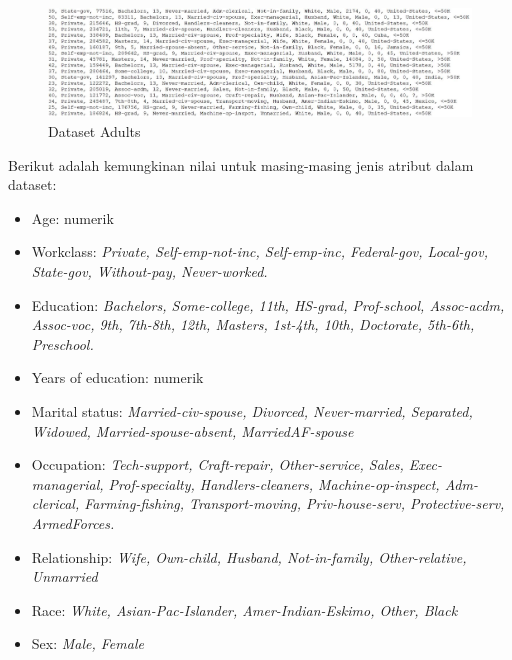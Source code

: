 \documentclass[a4paper,twoside]{article}
\begin{document}
\begin{enumerate}
\begin{adjustwidth}{2.2cm}{0cm}
\begin{figure}[H]
	\centering
	\includegraphics[scale=0.48]{dataset1}
	\caption{Dataset Adults}
	\label{fig:dataset1}
\end{figure}
\end{adjustwidth}

\noindent Berikut adalah kemungkinan nilai untuk masing-masing jenis atribut dalam dataset:

\begin{itemize}
\item Age: numerik

\item Workclass: \textit{Private, Self-emp-not-inc, Self-emp-inc, Federal-gov, Local-gov, State-gov, Without-pay, Never-worked.}

\item Education: \textit{Bachelors, Some-college, 11th, HS-grad, Prof-school, Assoc-acdm, Assoc-voc, 9th, 7th-8th, 12th, Masters, 1st-4th, 10th, Doctorate, 5th-6th, Preschool.}

\item Years of education: numerik

\item Marital status: 
\textit{Married-civ-spouse, Divorced, Never-married, Separated, Widowed, Married-spouse-absent, MarriedAF-spouse}

\item Occupation: \textit{Tech-support, Craft-repair, Other-service, Sales, Exec-managerial, Prof-specialty, Handlers-cleaners, Machine-op-inspect, Adm-clerical, Farming-fishing, Transport-moving, Priv-house-serv, Protective-serv, ArmedForces.}

\item Relationship: \textit{Wife, Own-child, Husband, Not-in-family, Other-relative, Unmarried}

\item Race: \textit{White, Asian-Pac-Islander, Amer-Indian-Eskimo, Other, Black}

\item Sex: \textit{Male, Female}


\end{itemize}
\end{enumerate}
\end{document}
